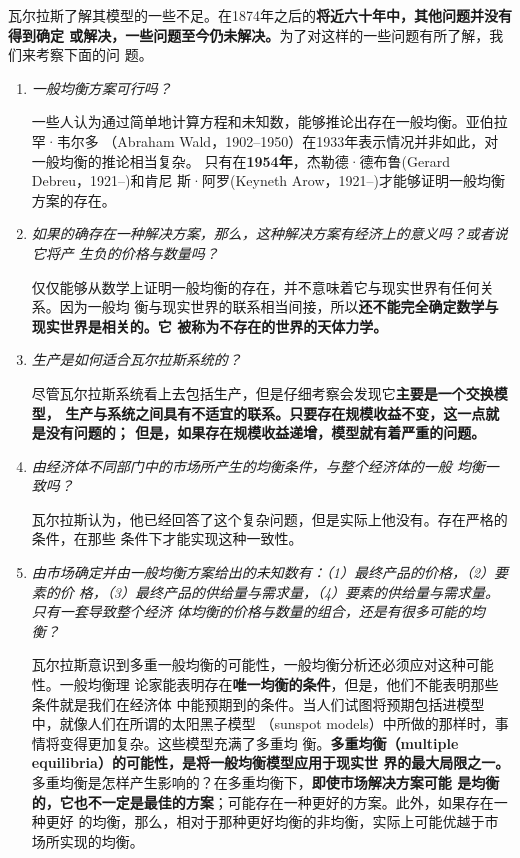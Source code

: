 瓦尔拉斯了解其模型的一些不足。在1874年之后的\textbf{将近六十年中，其他问题并没有得到确定
或解决，一些问题至今仍未解决。}为了对这样的一些问题有所了解，我们来考察下面的问
题。
\begin{enumerate}
\item \textit{一般均衡方案可行吗？}

  一些人认为通过简单地计算方程和未知数，能够推论出存在一般均衡。亚伯拉罕·韦尔多
  （Abraham Wald，1902--1950）在1933年表示情况并非如此，对一般均衡的推论相当复杂。
  只有在\textbf{1954年}，杰勒德·德布鲁(Gerard Debreu，1921--)和肯尼
  斯·阿罗(Keyneth Arow，1921--)才能够证明一般均衡方案的存在。

\item \textit{如果的确存在一种解决方案，那么，这种解决方案有经济上的意义吗？或者说它将产
  生负的价格与数量吗？}

仅仅能够从数学上证明一般均衡的存在，并不意味着它与现实世界有任何关系。因为一般均
衡与现实世界的联系相当间接，所以\textbf{还不能完全确定数学与现实世界是相关的。它
  被称为不存在的世界的天体力学。}

\item \textit{生产是如何适合瓦尔拉斯系统的？}

  尽管瓦尔拉斯系统看上去包括生产，但是仔细考察会发现它\textbf{主要是一个交换模型，
    生产与系统之间具有不适宜的联系。只要存在规模收益不变，这一点就是没有问题的；
    但是，如果存在规模收益递增，模型就有着严重的问题。}

\item \textit{由经济体不同部门中的市场所产生的均衡条件，与整个经济体的一般
均衡一致吗？}

瓦尔拉斯认为，他已经回答了这个复杂问题，但是实际上他没有。存在严格的条件，在那些
条件下才能实现这种一致性。

\item \textit{由市场确定并由一般均衡方案给出的未知数有：（1）最终产品的价格，（2）要素的价
  格，（3）最终产品的供给量与需求量，（4）要素的供给量与需求量。只有一套导致整个经济
  体均衡的价格与数量的组合，还是有很多可能的均衡？}

瓦尔拉斯意识到多重一般均衡的可能性，一般均衡分析还必须应对这种可能性。一般均衡理
论家能表明存在\textbf{唯一均衡的条件}，但是，他们不能表明那些条件就是我们在经济体
中能预期到的条件。当人们试图将预期包括进模型中，就像人们在所谓的太阳黑子模型
（sunspot models）中所做的那样时，事情将变得更加复杂。这些模型充满了多重均
衡。\textbf{多重均衡（multiple equilibria）的可能性，是将一般均衡模型应用于现实世
  界的最大局限之一。}多重均衡是怎样产生影响的？在多重均衡下，\textbf{即使市场解决方案可能
是均衡的，它也不一定是最佳的方案}；可能存在一种更好的方案。此外，如果存在一种更好
的均衡，那么，相对于那种更好均衡的非均衡，实际上可能优越于市场所实现的均衡。


\end{enumerate}
